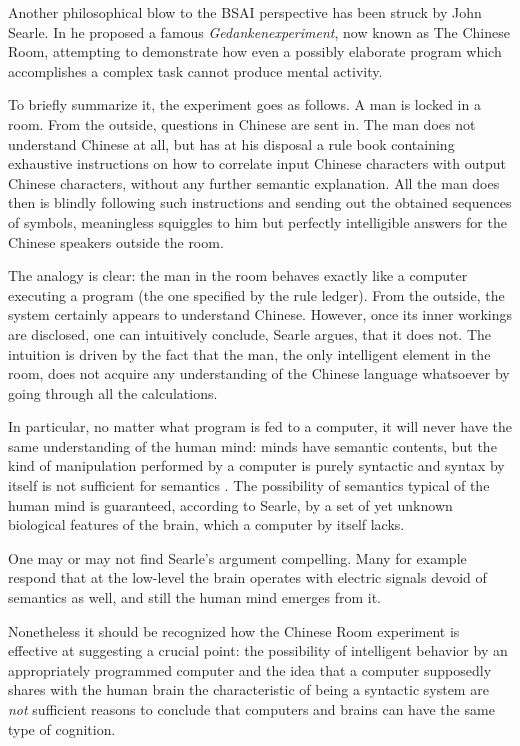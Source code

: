 \documentclass{article}
\begin{document}
Another philosophical blow to the BSAI perspective has been struck by John Searle. In \citep{searle1980minds} he proposed a famous \textit{Gedankenexperiment}, now known as The Chinese Room, attempting to demonstrate how even a possibly elaborate program which accomplishes a complex task cannot produce mental activity.

To briefly summarize it, the experiment goes as follows. A man is locked in a room. From the outside, questions in Chinese are sent in. The man does not understand Chinese at all, but has at his disposal a rule book containing exhaustive instructions on how to correlate input Chinese characters with output Chinese characters, without any further semantic explanation. All the man does then is blindly following such instructions and sending out the obtained sequences of symbols, meaningless squiggles to him but perfectly intelligible answers for the Chinese speakers outside the room.

The analogy is clear: the man in the room behaves exactly like a computer executing a program (the one specified by the rule ledger). From the outside, the system certainly appears to understand Chinese.  However, once its inner workings are disclosed, one can intuitively conclude, Searle argues, that it does not. The intuition is driven by the fact that the man, the only intelligent element in the room, does not acquire any understanding of the Chinese language whatsoever by going through all the calculations.

In particular, no matter what program is fed to a computer, it will never have the same understanding of the human mind: minds have semantic contents, but the kind of manipulation performed by a computer is purely syntactic and syntax by itself is not sufficient for semantics \citep{searle1998mystery}. The possibility of semantics typical of the human mind is guaranteed, according to Searle, by a set of yet unknown biological features of the brain, which a computer by itself lacks.

One may or may not find Searle's argument compelling. Many for example respond that at the low-level the brain operates with electric signals devoid of semantics as well, and still the human mind emerges from it.

Nonetheless it should be recognized how the Chinese Room experiment is effective at suggesting a crucial point: the possibility of intelligent behavior by an appropriately programmed computer and the idea that a computer supposedly shares with the human brain the characteristic of being a syntactic system are \textit{not} sufficient reasons to conclude that computers and brains can have the same type of cognition.
\end{document}
